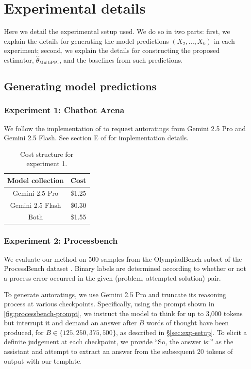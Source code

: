 \documentclass{article} %
\DeclareMathOperator{\multiPPI}{MultiPPI}
\begin{document}
\section{Experimental details}\label{sec:experimental-details}

Here we detail the experimental setup used. We do so in two parts: first, we explain the details for generating the model predictions $(X_2,\dots,X_k)$ in each experiment; second, we explain the details for constructing the proposed estimator, $\hat{\theta}_{\multiPPI}$, and the baselines from such predictions.

\subsection{Generating model predictions}

\subsubsection{Experiment 1: Chatbot Arena}
We follow the implementation of \citet{angelopoulos2025costoptimalactiveaimodel} to request autoratings from Gemini 2.5 Pro and Gemini 2.5 Flash. See section E of \citet{angelopoulos2025costoptimalactiveaimodel} for implementation details.

\begin{table}[]
    \centering
    \begin{tabular}{c|c}
        Model collection & Cost \\
        \hline
        Gemini 2.5 Pro & \$1.25 \\
        Gemini 2.5 Flash & \$0.30 \\
        Both & \$1.55
    \end{tabular}
    \caption{Cost structure for experiment 1.}
    \label{tab:cost-exp1}
\end{table}

\subsubsection{Experiment 2: Processbench}
We evaluate our method on 500 samples from the OlympiadBench subset of the ProcessBench dataset \citep{zheng2024processbench}. Binary labels are determined according to whether or not a process error occurred in the given (problem, attempted solution) pair.

To generate autoratings, we use Gemini 2.5 Pro and truncate its reasoning process at various checkpoints. Specifically, using the prompt shown in \autoref{fig:processbench-prompt}, we instruct the model to think for up to 3,000 tokens but interrupt it and demand an answer after $B$ words of thought have been produced, for $B\in\{125,250,375,500\}$, as described in \S\ref{sec:exp-setup}. To elicit a definite judgement at each checkpoint, we provide ``So, the answer is:'' as the assistant and attempt to extract an answer from the subsequent 20 tokens of output with our template.
\end{document}
